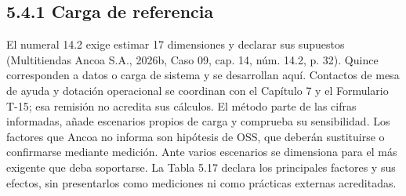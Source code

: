\documentclass[11pt]{article}
\begin{document}
\subsection{5.4.1 Carga de referencia}

El numeral 14.2 exige estimar 17 dimensiones y declarar sus supuestos (Multitiendas Ancoa S.A., 2026b, Caso 09, cap. 14, núm. 14.2, p. 32). Quince corresponden a datos o carga de sistema y se desarrollan aquí. Contactos de mesa de ayuda y dotación operacional se coordinan con el Capítulo 7 y el Formulario T-15; esa remisión no acredita sus cálculos. El método parte de las cifras informadas, añade escenarios propios de carga y comprueba su sensibilidad. Los factores que Ancoa no informa son hipótesis de OSS, que deberán sustituirse o confirmarse mediante medición. Ante varios escenarios se dimensiona para el más exigente que deba soportarse. La Tabla 5.17 declara los principales factores y sus efectos, sin presentarlos como mediciones ni como prácticas externas acreditadas.

\par\vspace{0pt plus 71\baselineskip}\vspace{0pt plus -71\baselineskip}
\end{document}
